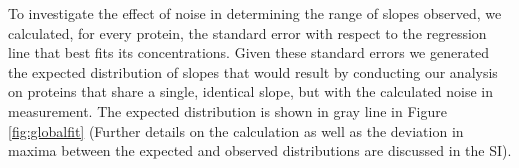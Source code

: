 To investigate the effect of noise in determining the range of slopes observed, we calculated, for every protein, the standard error with respect to the regression line that best fits its concentrations.
Given these standard errors we generated the expected distribution of slopes that would result by conducting our analysis on proteins that share a single, identical slope, but with the calculated noise in measurement.
The expected distribution is shown in gray line in Figure \ref{fig:globalfit} (Further details on the calculation as well as the deviation in maxima between the expected and observed distributions are discussed in the SI).